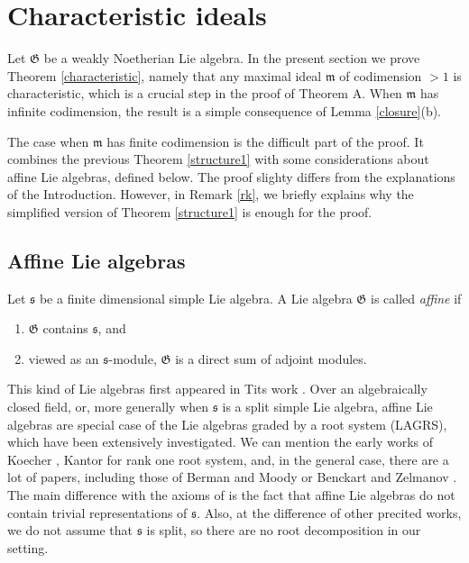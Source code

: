 \documentclass[11pt, letterpaper, reqno]{amsart}
\theoremstyle{definition}
\newcommand{\fm}{\mathfrak{m}}
\newcommand{\fs}{\mathfrak{s}}
\newcommand{\fG}{\mathfrak{G}}
\begin{document}
\section{Characteristic ideals}\label{Charac}
Let $\fG$ be a weakly Noetherian Lie algebra.
In the present section we prove Theorem \ref{characteristic}, namely 
that any maximal ideal $\fm$ of 
codimension $>1$ is characteristic, which is
a crucial step in the proof of  Theorem A. 
When $\fm$ has infinite codimension, the result is a simple consequence of Lemma \ref{closure}(b). 

The case when $\fm$ has finite codimension is the
difficult part of the proof. It combines
the previous Theorem \ref{structure1} with some considerations about affine Lie algebras, defined below. The proof slighty differs from
the explanations of the Introduction. However, in Remark \ref{rk}, we briefly explains why the simplified version of Theorem \ref{structure1} is enough for the proof.







\subsection{Affine Lie algebras}


Let $\fs$ be a finite dimensional simple Lie algebra. A Lie algebra $\fG$ is called {\it affine} if

\begin{enumerate}
\item[(a)] $\fG$ contains $\fs$, and

\item[(b)] viewed as an $\fs$-module,  $\fG$ is a direct sum of adjoint modules.
\end{enumerate}

This kind of Lie algebras first appeared in 
Tits work \cite{Tits1}\cite{Tits2}. 
Over an algebraically closed field, or, more generally
when $\fs$ is a split simple Lie algebra,
affine Lie algebras are special
case of the Lie algebras graded by a root system
(LAGRS), which have been extensively investigated.
We can mention the early works of Koecher 
 \cite{Koe}, Kantor \cite{Kan} for rank one root system,  and, in the general case, there are a lot of papers, including  those of Berman and Moody \cite{BerMoo} or Benckart and Zelmanov \cite{BenZel}.  The main  difference  with the 
axioms of  \cite{Tits1}\cite{Tits2}  is the fact that affine Lie algebras do not contain trivial representations of $\fs$. Also, at the difference of other precited works, we do not assume that $\fs$ is split, so  there are no root decomposition in our setting.
\end{document}

